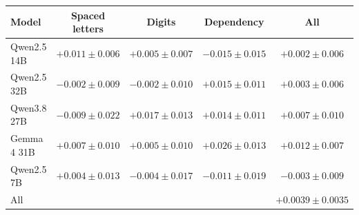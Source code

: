 \begin{tabular}{l ccc c}
\toprule
Model & Spaced letters & Digits & Dependency & All \\
\midrule
Qwen2.5 14B & $+0.011 \pm 0.006$ & $+0.005 \pm 0.007$ & $-0.015 \pm 0.015$ & $+0.002 \pm 0.006$ \\
Qwen2.5 32B & $-0.002 \pm 0.009$ & $-0.002 \pm 0.010$ & $+0.015 \pm 0.011$ & $+0.003 \pm 0.006$ \\
Qwen3.8 27B & $-0.009 \pm 0.022$ & $+0.017 \pm 0.013$ & $+0.014 \pm 0.011$ & $+0.007 \pm 0.010$ \\
Gemma 4 31B & $+0.007 \pm 0.010$ & $+0.005 \pm 0.010$ & $+0.026 \pm 0.013$ & $+0.012 \pm 0.007$ \\
Qwen2.5 7B & $+0.004 \pm 0.013$ & $-0.004 \pm 0.017$ & $-0.011 \pm 0.019$ & $-0.003 \pm 0.009$ \\
\midrule
All & & & & $+0.0039 \pm 0.0035$ \\
\bottomrule
\end{tabular}
